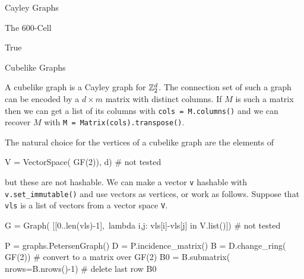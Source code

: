 \begin{chap}{Cayley Graphs}
\begin{sect}{The 600-Cell}
\begin{sagecode}
\begin{sageoutput}
True
\end{sageoutput}
\end{sagecode}
%
\end{sect}
%
\begin{sect}{Cubelike Graphs}
%
\begin{para}
A cubelike graph is a Cayley graph for ${\mathbb Z}_2^d$. The connection
set of such a graph can be encoded by a $d\times m$ matrix with distinct
columns. If $M$ is such a matrix then we can get a list of its columns with \verb|cols = M.columns()| and we can recover $M$ with \verb|M = Matrix(cols).transpose()|.
\end{para}
%
\begin{para}
The natural choice for the vertices of a cubelike graph are the elements of
\end{para}
%
\begin{sagecode}
\begin{sageinput}
V = VectorSpace( GF(2)), d)  # not tested
\end{sageinput}
\end{sagecode}
%
\begin{para}
but these are not hashable. We can make a vector \verb|v| hashable with \verb|v.set_immutable()| and use vectors as vertices, or work as follows.  Suppose that \verb|vls| is a list of vectors from a vector space \verb|V|.
\end{para}
%
\begin{sagecode}
\begin{sageinput}
G = Graph( [[0..len(vls)-1],\
    lambda i,j: vls[i]-vls[j] in V.list()]) # not tested
\end{sageinput}
\end{sagecode}
%
\begin{sagecode}
\begin{sageinput}
P = graphs.PetersenGraph()
D = P.incidence_matrix()
B = D.change_ring( GF(2))  # convert to a matrix over GF(2)
B0 = B.submatrix( nrows=B.nrows()-1)  # delete last row
B0
\end{sageinput}
\begin{sageoutput}
[1 1 1 0 0 0 0 0 0 0 0 0 0 0 0]
[0 0 1 1 1 0 0 0 0 0 0 0 0 0 0]
[0 0 0 0 1 1 1 0 0 0 0 0 0 0 0]
[0 0 0 0 0 0 1 1 1 0 0 0 0 0 0]
[0 1 0 0 0 0 0 0 1 1 0 0 0 0 0]
[1 0 0 0 0 0 0 0 0 0 1 1 0 0 0]
[0 0 0 1 0 0 0 0 0 0 0 0 1 1 0]
[0 0 0 0 0 1 0 0 0 0 0 1 0 0 1]
[0 0 0 0 0 0 0 1 0 0 1 0 0 1 0]
\end{sageoutput}
\end{sagecode}
%
\begin{para}

\end{para}
\end{sect}
\end{chap}
